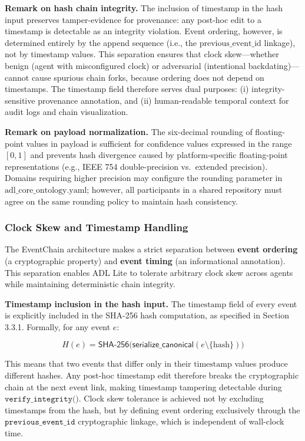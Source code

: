 \textbf{Remark on hash chain integrity.} The inclusion of \(\text{timestamp}\) in the hash input preserves tamper-evidence for provenance: any post-hoc edit to a timestamp is detectable as an integrity violation. Event ordering, however, is determined entirely by the append sequence (i.e., the \(\text{previous\_event\_id}\) linkage), not by timestamp values. This separation ensures that clock skew---whether benign (agent with misconfigured clock) or adversarial (intentional backdating)---cannot cause spurious chain forks, because ordering does not depend on timestamps. The timestamp field therefore serves dual purposes: (i) integrity-sensitive provenance annotation, and (ii) human-readable temporal context for audit logs and chain visualization.

\textbf{Remark on payload normalization.} The six-decimal rounding of floating-point values in \(\text{payload}\) is sufficient for confidence values expressed in the range \([0, 1]\) and prevents hash divergence caused by platform-specific floating-point representations (e.g., IEEE 754 double-precision vs.~extended precision). Domains requiring higher precision may configure the rounding parameter in \(\text{adl\_core\_ontology.yaml}\); however, all participants in a shared repository must agree on the same rounding policy to maintain hash consistency.

\subsubsection{Clock Skew and Timestamp Handling}\label{clock-skew-and-timestamp-handling}

The EventChain architecture makes a strict separation between \textbf{event ordering} (a cryptographic property) and \textbf{event timing} (an informational annotation). This separation enables ADL Lite to tolerate arbitrary clock skew across agents while maintaining deterministic chain integrity.

\textbf{Timestamp inclusion in the hash input.} The \(\text{timestamp}\) field of every event is explicitly included in the SHA-256 hash computation, as specified in Section 3.3.1. Formally, for any event \(e\):

\[
H(e) = \mathsf{SHA\text{-}256}\bigl(\mathsf{serialize\_canonical}(e \setminus \{\text{hash}\})\bigr)
\]

This means that two events that differ only in their \(\text{timestamp}\) values produce different hashes. Any post-hoc timestamp edit therefore breaks the cryptographic chain at the next event link, making timestamp tampering detectable during \(\texttt{verify\_integrity()}\). Clock skew tolerance is achieved not by excluding timestamps from the hash, but by defining event ordering exclusively through the \(\texttt{previous\_event\_id}\) cryptographic linkage, which is independent of wall-clock time.

